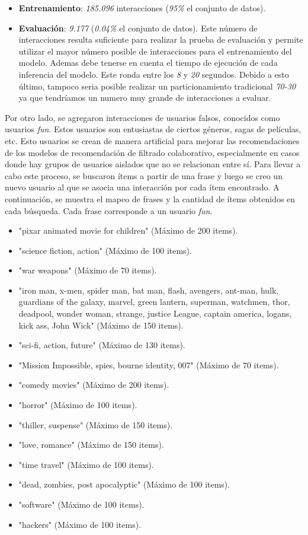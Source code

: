 \documentclass[11pt,a4paper,twoside]{thesis}
\begin{document}
\begin{itemize}
	\item \textbf{Entrenamiento}: \textit{185.096} interacciones (\textit{95\%} el conjunto de datos).
	\item \textbf{Evaluación}: \textit{9.177} (\textit{0.04\%} el conjunto de datos). Este número de interacciones resulta suficiente para realizar la prueba de evaluación y permite utilizar el mayor número posible de interacciones para el entrenamiento del modelo. Ademas debe tenerse en cuenta el tiempo de ejecución de cada inferencia del modelo. Este ronda entre los \textit{8} y \textit{20} segundos. Debido a esto último, tampoco seria posible realizar un particionamiento tradicional \textit{70-30} ya que tendríamos un numero muy grande de interacciones a evaluar.
\end{itemize}

Por otro lado, se agregaron interacciones de usuarios falsos, conocidos como usuarios \textit{fun}. Estos usuarios son entusiastas de ciertos géneros, sagas de películas, etc. Esto usuarios se crean de manera artificial para mejorar las recomendaciones de los modelos de recomendación de filtrado colaborativo, especialmente en casos donde hay grupos de usuarios aislados que no se relacionan entre sí. Para llevar a cabo este proceso, se buscaron ítems a partir de una frase y luego se creo un nuevo usuario al que se asocia una interacción por cada ítem encontrado. A continuación, se muestra el mapeo de frases y la cantidad de ítems obtenidos en cada búsqueda. Cada frase corresponde a un usuario \textit{fun}.

\begin{itemize}
	\item "pixar animated movie for children" (Máximo de 200 items).
	\item "science fiction, action" (Máximo de 100 items).
	\item "war weapons" (Máximo de 70 items).
	\item "iron man, x-men, spider man, bat man, flash, avengers, ant-man, hulk, guardians of the galaxy, marvel, green lantern, superman, watchmen, thor, deadpool, wonder woman, strange, justice League, captain america, logans, kick ass, John Wick" (Máximo de 150 items).
	\item "sci-fi, action, future" (Máximo de 130 items).
	\item "Mission Impossible, spies, bourne identity, 007" (Máximo de 70 items).
	\item "comedy movies" (Máximo de 200 items).
	\item "horror" (Máximo de 100 items).
	\item "thiller, suspense" (Máximo de 150 items).
	\item "love, romance" (Máximo de 150 items).
	\item "time travel" (Máximo de 100 items).
	\item "dead, zombies, post apocalyptic" (Máximo de 100 items).
	\item "software" (Máximo de 100 items).
	\item "hackers" (Máximo de 100 items).
\end{itemize}
\end{document}

